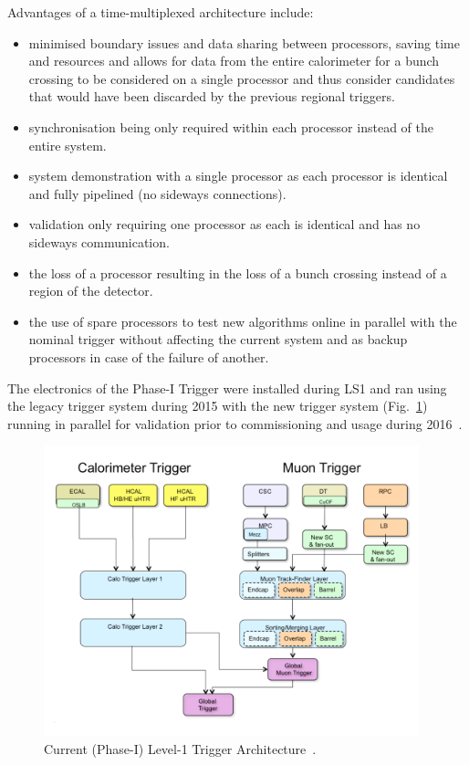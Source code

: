Advantages of a time-multiplexed architecture include:
\begin{itemize}
\item minimised boundary issues and data sharing between processors, saving time and resources and allows for data from the entire calorimeter for a bunch crossing to be considered on a single processor and thus consider candidates that would have been discarded by the previous regional triggers.
\item synchronisation being only required within each processor instead of the entire system.
\item system demonstration with a single processor as each processor is identical and fully pipelined (no sideways connections).
\item validation only requiring one processor as each is identical and has no sideways communication.
\item the loss of a processor resulting in the loss of a bunch crossing instead of a region of the detector.
\item the use of spare processors to test new algorithms online in parallel with the nominal trigger without affecting the current system and as backup processors in case of the failure of another.
\end{itemize} 

The electronics of the Phase-I Trigger were installed during LS1 and ran using the legacy trigger system during 2015 with the new trigger system (Fig.~\ref{fig:trigger}) running in parallel for validation prior to commissioning and usage during 2016~\cite{Zabi:2017lya}.

\begin{figure}[htbp]
\begin{center}
\includegraphics[width=0.97\textwidth]{figs/cms/TrigUpgradeBlockDiagram.pdf}
\caption{Current (Phase-I) Level-1 Trigger Architecture~\cite{Tapper:2013yva}.}
\label{fig:trigger}
\end{center}
\end{figure}


